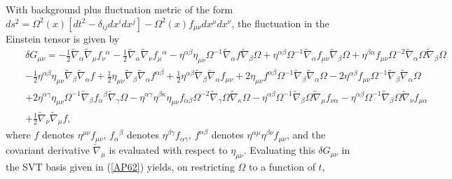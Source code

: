 \documentclass[aps]{revtex4}
\begin{document}
With  background plus fluctuation metric of the form $ds^2=\Omega^2(x)[dt^2-\delta_{ij}dx^idx^j]-\Omega^2(x)f_{\mu\nu}dx^{\mu}dx^{\nu}$, the fluctuation in the Einstein tensor is given by 
%
\begin{eqnarray}
&&\delta G_{\mu\nu}=- \tfrac{1}{2}\tilde{\nabla}_{\alpha}\tilde{\nabla}_{\mu}f_{\nu}{}^{\alpha} -  \tfrac{1}{2} \tilde{\nabla}_{\alpha}\tilde{\nabla}_{\nu}f_{\mu}{}^{\alpha} -  \eta^{\alpha \beta} \eta_{\mu \nu} \Omega^{-1}\tilde{\nabla}_{\alpha}f \tilde{\nabla}_{\beta}\Omega + \eta^{\alpha \beta} \Omega^{-1} \tilde{\nabla}_{\alpha}f_{\mu \nu} \tilde{\nabla}_{\beta}\Omega + \eta^{\beta \alpha} f_{\mu \nu} \Omega^{-2}\tilde{\nabla}_{\alpha}\Omega \tilde{\nabla}_{\beta}\Omega 
\nonumber\\
&&-  \tfrac{1}{2} \eta^{\alpha \beta} \eta_{\mu \nu} \tilde{\nabla}_{\beta}\tilde{\nabla}_{\alpha}f + \tfrac{1}{2} \eta_{\mu \nu}\tilde{\nabla}_{\beta}\tilde{\nabla}_{\alpha}f^{\alpha \beta} + \tfrac{1}{2} \eta^{\alpha \beta} \tilde{\nabla}_{\beta}\tilde{\nabla}_{\alpha}f_{\mu \nu} + 2 \eta_{\mu \nu} f^{\alpha \beta} \Omega^{-1} \tilde{\nabla}_{\beta}\tilde{\nabla}_{\alpha}\Omega - 2 \eta^{\alpha \beta} f_{\mu \nu} \Omega^{-1} \tilde{\nabla}_{\beta}\tilde{\nabla}_{\alpha}\Omega 
\nonumber\\
&&+ 2 \eta^{\alpha \gamma} \eta_{\mu \nu} \Omega^{-1} \tilde{\nabla}_{\beta}f_{\alpha}{}^{\beta} \tilde{\nabla}_{\gamma}\Omega -  \eta^{\alpha \gamma} \eta^{\beta \kappa} \eta_{\mu \nu} f_{\alpha \beta} \Omega^{-2} \tilde{\nabla}_{\gamma}\Omega\tilde{\nabla}_{\kappa}\Omega -  \eta^{\alpha \beta} \Omega^{-1}\tilde{\nabla}_{\beta}\Omega \tilde{\nabla}_{\mu}f_{\nu \alpha} -  \eta^{\alpha \beta} \Omega^{-1}\tilde{\nabla}_{\beta}\Omega \tilde{\nabla}_{\nu}f_{\mu \alpha} 
\nonumber\\
&&+ \tfrac{1}{2} \tilde{\nabla}_{\nu}\tilde{\nabla}_{\mu}f,
\label{AP76}
\end{eqnarray}
%
where $f$ denotes $\eta^{\mu\nu}f_{\mu\nu}$,  $f_{\alpha}{}^{\beta}$ denotes $\eta^{\beta\gamma}f_{\alpha\gamma}$, $f^{\alpha\beta}$ denotes $\eta^{\alpha\mu}\eta^{\beta\nu}f_{\mu\nu}$, and the covariant derivative $\tilde{\nabla}_{\mu}$ is evaluated with respect to $\eta_{\mu\nu}$. Evaluating this $\delta G_{\mu\nu}$ in the SVT basis given in (\ref{AP62}) yields, on restricting $\Omega$ to a function of $t$,
%
\end{document}
